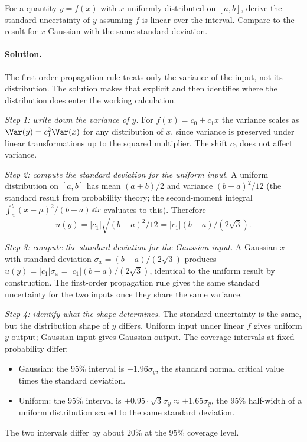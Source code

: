\begin{exercise}
For a quantity $y = f(x)$ with $x$ uniformly distributed on
$[a, b]$, derive the standard uncertainty of $y$ assuming $f$ is
linear over the interval. Compare to the result for $x$ Gaussian
with the same standard deviation.
\end{exercise}

\paragraph{Solution.}
The first-order propagation rule treats only the variance of the
input, not its distribution. The solution makes that explicit and
then identifies where the distribution does enter the working
calculation.

\emph{Step 1: write down the variance of $y$.} For
$f(x) = c_{0} + c_{1} x$ the variance scales as $\Var(y) =
c_{1}^{2} \Var(x)$ for any distribution of $x$, since variance is
preserved under linear transformations up to the squared
multiplier. The shift $c_{0}$ does not affect variance.

\emph{Step 2: compute the standard deviation for the uniform input.}
A uniform distribution on $[a, b]$ has mean $(a + b)/2$ and
variance $(b - a)^{2}/12$ (the standard result from probability
theory; the second-moment integral $\int_{a}^{b}(x - \mu)^{2}/(b-a)
\,\dd x$ evaluates to this). Therefore
\[
u(y) = |c_{1}| \sqrt{(b - a)^{2}/12} = |c_{1}| (b-a)/(2\sqrt{3}).
\]

\emph{Step 3: compute the standard deviation for the Gaussian
input.} A Gaussian $x$ with standard deviation $\sigma_{x} =
(b-a)/(2\sqrt{3})$ produces $u(y) = |c_{1}| \sigma_{x} =
|c_{1}|(b-a)/(2\sqrt{3})$, identical to the uniform result by
construction. The first-order propagation rule gives the same
standard uncertainty for the two inputs once they share the same
variance.

\emph{Step 4: identify what the shape determines.} The standard
uncertainty is the same, but the distribution shape of $y$ differs.
Uniform input under linear $f$ gives uniform $y$ output; Gaussian
input gives Gaussian output. The coverage intervals at fixed
probability differ:
\begin{itemize}
  \item Gaussian: the $95\%$ interval is $\pm 1.96\sigma_{y}$,
    the standard normal critical value times the standard deviation.
  \item Uniform: the $95\%$ interval is $\pm 0.95 \cdot \sqrt{3}
    \sigma_{y} \approx \pm 1.65 \sigma_{y}$, the $95\%$ half-width
    of a uniform distribution scaled to the same standard
    deviation.
\end{itemize}
The two intervals differ by about $20\%$ at the $95\%$ coverage
level.

